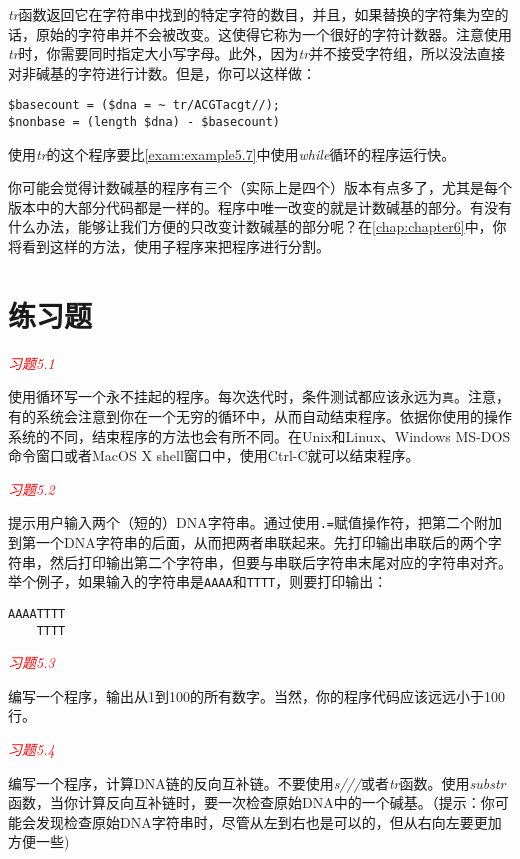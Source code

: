 \textit{tr}函数返回它在字符串中找到的特定字符的数目，并且，如果替换的字符集为空的话，原始的字符串并不会被改变。这使得它称为一个很好的字符计数器。注意使用\textit{tr}时，你需要同时指定大小写字母。此外，因为\textit{tr}并不接受字符组，所以没法直接对非碱基的字符进行计数。但是，你可以这样做：

\begin{lstlisting}
$basecount = ($dna = ~ tr/ACGTacgt//);
$nonbase = (length $dna) - $basecount)
\end{lstlisting}

使用\textit{tr}的这个程序要比\autoref{exam:example5.7}中使用\textit{while}循环的程序运行快。

你可能会觉得计数碱基的程序有三个（实际上是四个）版本有点多了，尤其是每个版本中的大部分代码都是一样的。程序中唯一改变的就是计数碱基的部分。有没有什么办法，能够让我们方便的只改变计数碱基的部分呢？在\autoref{chap:chapter6}中，你将看到这样的方法，使用子程序来把程序进行分割。

\section{练习题}
\textcolor{red}{\textit{习题5.1}}
\begin{adjustwidth}{4em}{}
使用循环写一个永不挂起的程序。每次迭代时，条件测试都应该永远为\verb|真|。注意，有的系统会注意到你在一个无穷的循环中，从而自动结束程序。依据你使用的操作系统的不同，结束程序的方法也会有所不同。在Unix和Linux、Windows
MS-DOS命令窗口或者MacOS X shell窗口中，使用Ctrl-C就可以结束程序。
\end{adjustwidth}

\textcolor{red}{\textit{习题5.2}}
\begin{adjustwidth}{4em}{}
提示用户输入两个（短的）DNA字符串。通过使用\verb|.=|赋值操作符，把第二个附加到第一个DNA字符串的后面，从而把两者串联起来。先打印输出串联后的两个字符串，然后打印输出第二个字符串，但要与串联后字符串末尾对应的字符串对齐。举个例子，如果输入的字符串是\verb|AAAA|和\verb|TTTT|，则要打印输出：
\begin{verbatim}
AAAATTTT
    TTTT
\end{verbatim}
\end{adjustwidth}

\textcolor{red}{\textit{习题5.3}}
\begin{adjustwidth}{4em}{}
编写一个程序，输出从1到100的所有数字。当然，你的程序代码应该远远小于100行。
\end{adjustwidth}

\textcolor{red}{\textit{习题5.4}}
\begin{adjustwidth}{4em}{}
编写一个程序，计算DNA链的反向互补链。不要使用\textit{s///}或者\textit{tr}函数。使用\textit{substr}函数，当你计算反向互补链时，要一次检查原始DNA中的一个碱基。（提示：你可能会发现检查原始DNA字符串时，尽管从左到右也是可以的，但从右向左要更加方便一些) 
\end{adjustwidth}

